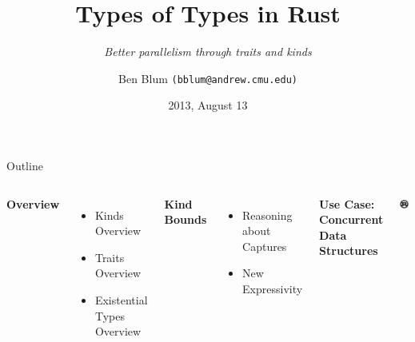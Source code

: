 \documentclass[xcolor=dvipsnames]{beamer}
\title[Kinds for Parallelism]{{\bf Types of Types in Rust}}
\subtitle[]{ {\em Better parallelism through traits and kinds}}
\author[Ben Blum]{Ben Blum \texttt{(bblum@andrew.cmu.edu)}}
\institute[Mozilla Research]{Mozilla Research}
\date[]{2013, August 13}
\begin{document}
\renewcommand{\inserttotalframenumber}{28}
\normalem
\begin{frame}
	\titlepage
\end{frame}


\newcommand\linegap{\vspace{0.2in}}
\newcommand\breakslide[1]{\begin{frame}{} \begin{center} \Large #1 \end{center} \end{frame}}
\newcommand\related[1]{\textsuperscript{\em [#1]}}
\newcommand\hilight[2]{\color{#1}#2\color{black}}

\begin{frame}{Outline}
	\begin{columns}
	\textbf{Overview}
	\begin{itemize}
		\item Kinds Overview
		\item Traits Overview
		\item Existential Types Overview
	\end{itemize}
	\linegap

	{\bf Kind Bounds}
	\begin{itemize}
		\item Reasoning about Captures
		\item New Expressivity
	\end{itemize}
	\linegap

	{\bf Use Case: Concurrent Data Structures}
	\linegap

	\begin{center}
	\includegraphics[width=0.9\textwidth]{rust.png}
	\end{center}
	\end{columns}
\end{frame}
\end{document}
